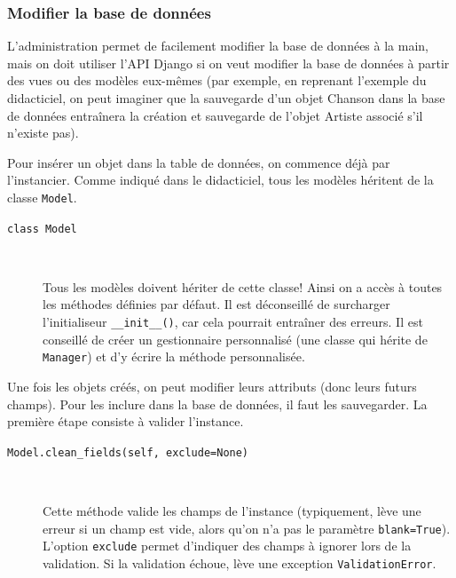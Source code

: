 \documentclass[a4paper, 10pt]{article}
\begin{document}
{\subsubsection{Modifier la base de données}
L'administration  permet de facilement modifier la base de données à la main, mais on doit utiliser l'API Django si on veut modifier la base de données à partir des vues ou des modèles eux-mêmes (par exemple, en reprenant l'exemple du didacticiel, on peut imaginer que la sauvegarde d'un objet Chanson dans la base de données entraînera la création et sauvegarde de l'objet Artiste associé s'il n'existe pas).\bigskip

Pour insérer un objet dans la table de données, on commence déjà par l'instancier. Comme indiqué dans le didacticiel, tous les modèles héritent de la classe \texttt{Model}.

\begin{description}
	\item[\texttt{class Model}]~

	      Tous les modèles doivent hériter de cette classe! Ainsi on a accès à toutes les méthodes définies par défaut. Il est déconseillé de surcharger l'initialiseur \texttt{__init__()}, car cela pourrait entraîner des erreurs. Il est conseillé de créer un gestionnaire personnalisé (une classe qui hérite de \texttt{Manager}) et d'y écrire la méthode personnalisée.
\end{description}

Une fois les objets créés, on peut modifier leurs attributs (donc leurs futurs champs). Pour les inclure dans la base de données, il faut les sauvegarder. La première étape consiste à valider l'instance.

\begin{description}
	\item[\texttt{Model.clean_fields(self, exclude=None)}]~

	      Cette méthode valide les champs de l'instance (typiquement, lève une erreur si un champ est vide, alors qu'on n'a pas le paramètre \texttt{blank=True}). L'option \texttt{exclude} permet d'indiquer des champs à ignorer lors de la validation. Si la validation échoue, lève une exception \texttt{ValidationError}.


\end{description}}
\end{document}
